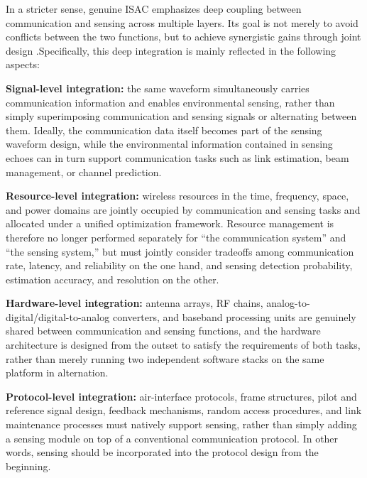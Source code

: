 In a stricter sense, genuine ISAC emphasizes deep coupling between communication and sensing across multiple layers. Its goal is not merely to avoid conflicts between the two functions, but to achieve synergistic gains through joint design \cite{Liu2022ISAC,Zhang2021ISAC6G}.Specifically, this deep integration is mainly reflected in the following aspects:

\begin{itemize}
    \item \textbf{Signal-level integration:} the same waveform simultaneously carries communication information and enables environmental sensing, rather than simply superimposing communication and sensing signals or alternating between them. Ideally, the communication data itself becomes part of the sensing waveform design, while the environmental information contained in sensing echoes can in turn support communication tasks such as link estimation, beam management, or channel prediction.

    \item \textbf{Resource-level integration:} wireless resources in the time, frequency, space, and power domains are jointly occupied by communication and sensing tasks and allocated under a unified optimization framework. Resource management is therefore no longer performed separately for ``the communication system'' and ``the sensing system,'' but must jointly consider tradeoffs among communication rate, latency, and reliability on the one hand, and sensing detection probability, estimation accuracy, and resolution on the other.
    
    \begin{sloppypar}
    \item \textbf{Hardware-level integration:} antenna arrays, RF chains, analog-to-digital/digital-to-analog converters, and baseband processing units are genuinely shared between communication and sensing functions, and the hardware architecture is designed from the outset to satisfy the requirements of both tasks, rather than merely running two independent software stacks on the same platform in alternation.
    \end{sloppypar}

    \item \textbf{Protocol-level integration:} air-interface protocols, frame structures, pilot and reference signal design, feedback mechanisms, random access procedures, and link maintenance processes must natively support sensing, rather than simply adding a sensing module on top of a conventional communication protocol. In other words, sensing should be incorporated into the protocol design from the beginning.


\end{itemize}
